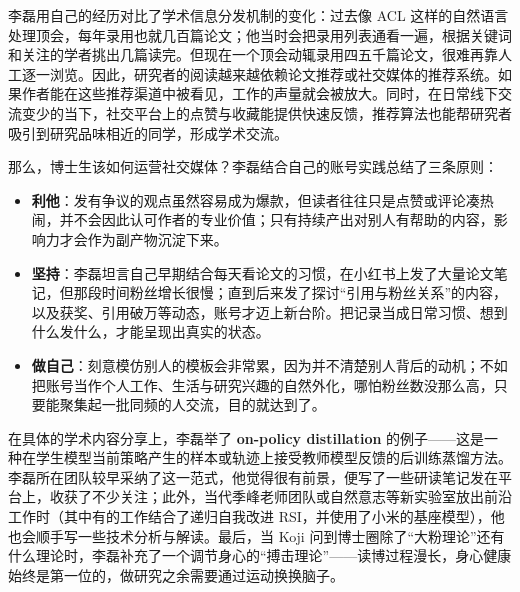 \documentclass[UTF8,a4paper,11pt,fontset=fandol]{ctexart}
\begin{document}
李磊用自己的经历对比了学术信息分发机制的变化：过去像 ACL 这样的自然语言处理顶会，每年录用也就几百篇论文；他当时会把录用列表通看一遍，根据关键词和关注的学者挑出几篇读完。但现在一个顶会动辄录用四五千篇论文，很难再靠人工逐一浏览。因此，研究者的阅读越来越依赖论文推荐或社交媒体的推荐系统。如果作者能在这些推荐渠道中被看见，工作的声量就会被放大。同时，在日常线下交流变少的当下，社交平台上的点赞与收藏能提供快速反馈，推荐算法也能帮研究者吸引到研究品味相近的同学，形成学术交流。

那么，博士生该如何运营社交媒体？李磊结合自己的账号实践总结了三条原则：
\begin{itemize}
\item \textbf{利他}：发有争议的观点虽然容易成为爆款，但读者往往只是点赞或评论凑热闹，并不会因此认可作者的专业价值；只有持续产出对别人有帮助的内容，影响力才会作为副产物沉淀下来。
\item \textbf{坚持}：李磊坦言自己早期结合每天看论文的习惯，在小红书上发了大量论文笔记，但那段时间粉丝增长很慢；直到后来发了探讨“引用与粉丝关系”的内容，以及获奖、引用破万等动态，账号才迈上新台阶。把记录当成日常习惯、想到什么发什么，才能呈现出真实的状态。
\item \textbf{做自己}：刻意模仿别人的模板会非常累，因为并不清楚别人背后的动机；不如把账号当作个人工作、生活与研究兴趣的自然外化，哪怕粉丝数没那么高，只要能聚集起一批同频的人交流，目的就达到了。
\end{itemize}

在具体的学术内容分享上，李磊举了 \textbf{on-policy distillation} 的例子——这是一种在学生模型当前策略产生的样本或轨迹上接受教师模型反馈的后训练蒸馏方法。李磊所在团队较早采纳了这一范式，他觉得很有前景，便写了一些研读笔记发在平台上，收获了不少关注；此外，当代季峰老师团队或自然意志等新实验室放出前沿工作时（其中有的工作结合了递归自我改进 RSI，并使用了小米的基座模型），他也会顺手写一些技术分析与解读。最后，当 Koji 问到博士圈除了“大粉理论”还有什么理论时，李磊补充了一个调节身心的“搏击理论”——读博过程漫长，身心健康始终是第一位的，做研究之余需要通过运动换换脑子。
\end{document}
